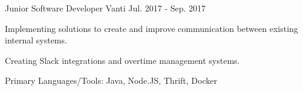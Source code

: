 

\begin{cventries}

  \cventry
    {Junior Software Developer} %
    {Vanti} %
    {} %
    {Jul. 2017 - Sep. 2017} %
    {
      \begin{cvitems} %
        \item {Implementing solutions to create and improve communication between existing internal systems.}
        \item {Creating Slack integrations and overtime management systems.}
        \item {Primary Languages/Tools: Java, Node.JS, Thrift, Docker}
      \end{cvitems}
    }



\end{cventries}
